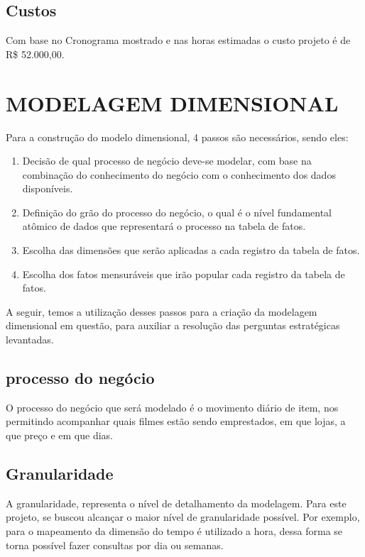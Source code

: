 \section{Custos}

Com base no Cronograma mostrado e nas horas estimadas o custo projeto é de R\$ 52.000,00.

\chapter{MODELAGEM DIMENSIONAL}

Para a construção do modelo dimensional, 4 passos são necessários, sendo eles:

\begin{enumerate}
\item Decisão de qual processo de negócio deve-se modelar, com base na combinação do conhecimento do negócio com o conhecimento dos dados disponíveis.
\item Definição do grão do processo do negócio, o qual é o nível fundamental atômico de dados que representará o processo na tabela de fatos.
\item Escolha das dimensões que serão aplicadas a cada registro da tabela de fatos.
\item Escolha dos fatos mensuráveis que irão popular cada registro da tabela de fatos.
\end{enumerate}

A seguir, temos a utilização desses passos para a criação da modelagem dimensional em questão, para auxiliar a resolução das perguntas estratégicas levantadas.
 
\section{processo do negócio}

O processo do negócio que será modelado é o movimento diário de item, nos permitindo acompanhar quais filmes estão sendo emprestados, em que lojas, a que preço e em que dias.


\section{Granularidade}

A granularidade, representa o nível de
detalhamento da modelagem.
Para este projeto, se buscou alcançar o maior nível de granularidade possível. Por exemplo, para o 
mapeamento da dimensão do tempo é utilizado a hora, 
dessa forma se torna possível fazer 
consultas por dia ou semanas. 

